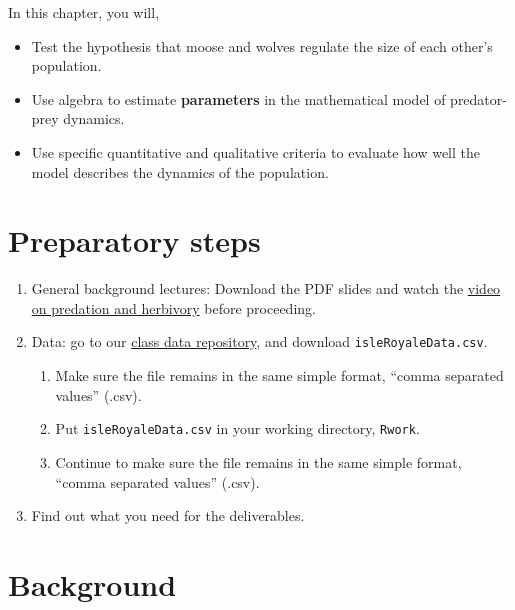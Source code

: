 \documentclass[
  letterpaper,
  DIV=11,
  numbers=noendperiod]{scrreprt}
\providecommand{\tightlist}{%
  \setlength{\itemsep}{0pt}\setlength{\parskip}{0pt}}
\begin{document}
In this chapter, you will,

\begin{itemize}
\tightlist
\item
  Test the hypothesis that moose and wolves regulate the size of each
  other's population.
\item
  Use algebra to estimate \textbf{parameters} in the mathematical model
  of predator-prey dynamics.
\item
  Use specific quantitative and qualitative criteria to evaluate how
  well the model describes the dynamics of the population.
\end{itemize}

\section{Preparatory steps}\label{preparatory-steps-6}

\begin{enumerate}
\def\labelenumi{\arabic{enumi}.}
\tightlist
\item
  General background lectures: Download the PDF slides and watch the
  \href{https://drive.google.com/drive/folders/1nWLoEGuWKIWdul9Uvse5qiB1Hf8MCwUv?usp=sharing}{video
  on predation and herbivory} before proceeding.
\item
  Data: go to our
  \href{https://drive.google.com/drive/u/1/folders/1FR2FLiW3xyD4Er52YzVTToPZuXXReGRo}{class
  data repository}, and download \texttt{isleRoyaleData.csv}.

  \begin{enumerate}
  \def\labelenumii{\alph{enumii}.}
  \tightlist
  \item
    Make sure the file remains in the same simple format, ``comma
    separated values'' (.csv).
  \item
    Put \texttt{isleRoyaleData.csv} in your working directory,
    \texttt{Rwork}.
  \item
    Continue to make sure the file remains in the same simple format,
    ``comma separated values'' (.csv).
  \end{enumerate}
\item
  Find out what you need for the deliverables.
\end{enumerate}

\section{Background}\label{background-7}
\end{document}
